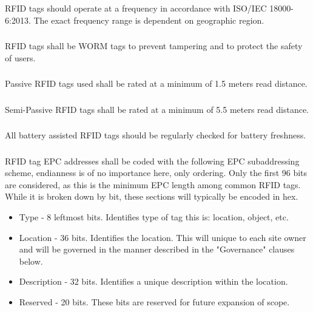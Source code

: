 \documentclass{article}
\begin{document}
\subsubsection{} RFID tags should operate at a frequency in accordance with ISO/IEC 18000-6:2013. The exact frequency range is dependent on geographic region.

\subsubsection{} RFID tags shall be WORM tags to prevent tampering and to protect the safety of users.

\subsubsection{} Passive RFID tags used shall be rated at a minimum of 1.5 meters read distance.

\subsubsection{} Semi-Passive RFID tags shall be rated at a minimum of 5.5 meters read distance.

\subsubsection{} All battery assisted RFID tags should be regularly checked for battery freshness.

\subsubsection{} RFID tag EPC addresses shall be coded with the following EPC subaddressing scheme, endianness is of no importance here, only ordering. Only the first 96 bits are considered, as this is the minimum EPC length among common RFID tags. While it is broken down by bit, these sections will typically be encoded in hex.

\begin{itemize}
  \item Type - 8 leftmost bits. Identifies type of tag this is: location, object, etc.
  \item Location - 36 bits. Identifies the location. This will unique to each site owner and will be governed in the manner described in the "Governance" clauses below.
  \item Description - 32 bits. Identifies a unique description within the location.
  \item Reserved - 20 bits. These bits are reserved for future expansion of scope.
\end{itemize}
\end{document}
